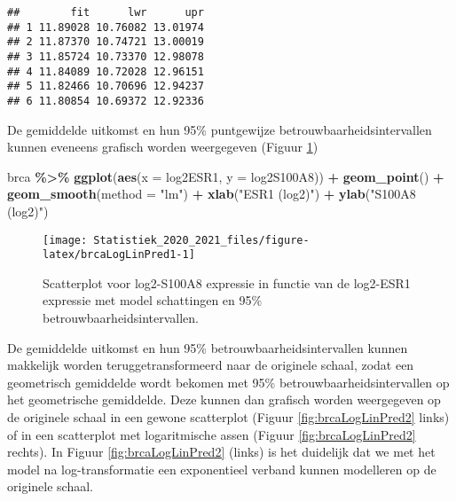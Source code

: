 \documentclass[
  12pt,dutch,coursenotes]{book}
\newenvironment{Shaded}{\begin{snugshade}}{\end{snugshade}}
\newcommand{\DataTypeTok}[1]{\textcolor[rgb]{0.13,0.29,0.53}{#1}}
\newcommand{\KeywordTok}[1]{\textcolor[rgb]{0.13,0.29,0.53}{\textbf{#1}}}
\newcommand{\NormalTok}[1]{#1}
\newcommand{\OperatorTok}[1]{\textcolor[rgb]{0.81,0.36,0.00}{\textbf{#1}}}
\newcommand{\StringTok}[1]{\textcolor[rgb]{0.31,0.60,0.02}{#1}}
\theoremstyle{definition}
\theoremstyle{definition}
\theoremstyle{definition}
\theoremstyle{remark}
\begin{document}
\begin{verbatim}
##        fit      lwr      upr
## 1 11.89028 10.76082 13.01974
## 2 11.87370 10.74721 13.00019
## 3 11.85724 10.73370 12.98078
## 4 11.84089 10.72028 12.96151
## 5 11.82466 10.70696 12.94237
## 6 11.80854 10.69372 12.92336
\end{verbatim}

De gemiddelde uitkomst en hun 95\% puntgewijze betrouwbaarheidsintervallen kunnen eveneens grafisch worden weergegeven (Figuur \ref{fig:brcaLogLinPred1})

\begin{Shaded}
\begin{Highlighting}[]
\NormalTok{brca }\OperatorTok{\%\textgreater{}\%}\StringTok{ }\KeywordTok{ggplot}\NormalTok{(}\KeywordTok{aes}\NormalTok{(}\DataTypeTok{x =}\NormalTok{ log2ESR1, }\DataTypeTok{y =}\NormalTok{ log2S100A8)) }\OperatorTok{+}\StringTok{ }
\StringTok{    }\KeywordTok{geom\_point}\NormalTok{() }\OperatorTok{+}\StringTok{ }\KeywordTok{geom\_smooth}\NormalTok{(}\DataTypeTok{method =} \StringTok{"lm"}\NormalTok{) }\OperatorTok{+}\StringTok{ }\KeywordTok{xlab}\NormalTok{(}\StringTok{"ESR1 (log2)"}\NormalTok{) }\OperatorTok{+}\StringTok{ }
\StringTok{    }\KeywordTok{ylab}\NormalTok{(}\StringTok{"S100A8 (log2)"}\NormalTok{)}
\end{Highlighting}
\end{Shaded}

\begin{figure}

{\centering \texttt{[image: Statistiek\_2020\_2021\_files/figure-latex/brcaLogLinPred1-1]} 

}

\caption{Scatterplot voor log2-S100A8 expressie in functie van de log2-ESR1 expressie met model schattingen en 95$\%$ betrouwbaarheidsintervallen.}\label{fig:brcaLogLinPred1}
\end{figure}

De gemiddelde uitkomst en hun 95\% betrouwbaarheidsintervallen kunnen makkelijk worden teruggetransformeerd naar de originele schaal, zodat een geometrisch gemiddelde wordt bekomen met 95\% betrouwbaarheidsintervallen op het geometrische gemiddelde.
Deze kunnen dan grafisch worden weergegeven op de originele schaal in een gewone scatterplot (Figuur \ref{fig:brcaLogLinPred2} links) of in een scatterplot met logaritmische assen (Figuur \ref{fig:brcaLogLinPred2} rechts).
In Figuur \ref{fig:brcaLogLinPred2} (links) is het duidelijk dat we met het model na log-transformatie een exponentieel verband kunnen modelleren op de originele schaal.
\end{document}
